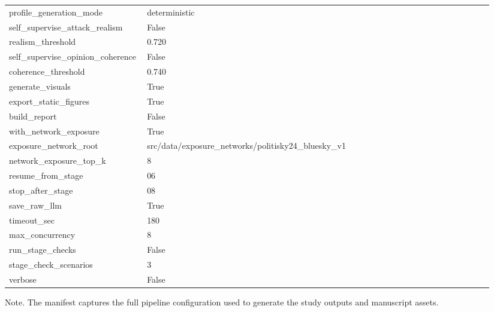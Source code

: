 \begin{table}[htbp]
\begin{threeparttable}
\begin{tabular}{p{0.24\linewidth}p{0.70\linewidth}}
profile\_generation\_mode & deterministic \\
self\_supervise\_attack\_realism & False \\
realism\_threshold & 0.720 \\
self\_supervise\_opinion\_coherence & False \\
coherence\_threshold & 0.740 \\
generate\_visuals & True \\
export\_static\_figures & True \\
build\_report & False \\
with\_network\_exposure & True \\
exposure\_network\_root & src/data/exposure\_networks/politisky24\_bluesky\_v1 \\
network\_exposure\_top\_k & 8 \\
resume\_from\_stage & 06 \\
stop\_after\_stage & 08 \\
save\_raw\_llm & True \\
timeout\_sec & 180 \\
max\_concurrency & 8 \\
run\_stage\_checks & False \\
stage\_check\_scenarios & 3 \\
verbose & False \\
\bottomrule
\end{tabular}
\begin{tablenotes}[flushleft]
\footnotesize
\item Note. The manifest captures the full pipeline configuration used to generate the study outputs and manuscript assets.
\end{tablenotes}
\end{threeparttable}
\end{table}